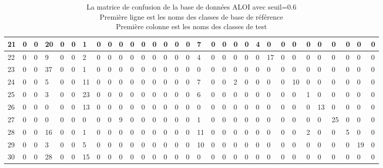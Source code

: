 \documentclass[french,12pt,a4paper,oneside,notitlepage]{report}
\begin{document}
\begin{table}[!ht]
\begin{center}
{\begin{tabular}{|l|l|l|l|l|l|l|l|l|l|l|l|l|l|l|l|l|l|l|l|l|l|l|l|l|l|l|l|l|l|l|}
\hline
21&0&0&20&0&0&1&0&0&0&0&0&0&0&0&0&7&0&0&0&0&4&0&0&0&0&0&0&0&0&0\\
\hline
22&0&0&9&0&0&2&0&0&0&0&0&0&0&0&0&4&0&0&0&0&0&17&0&0&0&0&0&0&0&0\\
\hline
23&0&0&37&0&0&1&0&0&0&0&0&0&0&0&0&0&0&0&0&0&0&0&0&0&0&0&0&0&0&0\\
\hline
24&0&0&5&0&0&11&0&0&0&0&0&0&0&0&0&7&0&0&2&0&0&0&0&10&0&0&0&0&0&0\\
\hline
25&0&0&3&0&0&23&0&0&0&0&0&0&0&0&0&6&0&0&0&0&0&0&0&0&1&0&0&0&0&0\\
\hline
26&0&0&0&0&0&13&0&0&0&0&0&0&0&0&0&0&0&0&0&0&0&0&0&0&0&13&0&0&0&0\\
\hline
27&0&0&0&0&0&0&0&0&9&0&0&0&0&0&0&1&0&0&0&0&0&0&0&0&0&0&25&0&0&0\\
\hline
28&0&0&16&0&0&1&0&0&0&0&0&0&0&0&0&11&0&0&0&0&0&0&0&0&2&0&0&5&0&0\\
\hline
29&0&0&3&0&0&5&0&0&0&0&0&0&0&0&0&10&0&0&0&0&0&0&0&0&0&0&0&0&19&0\\
\hline
30&0&0&28&0&0&15&0&0&0&0&0&0&0&0&0&0&0&0&0&0&0&0&0&0&0&0&0&0&0&0\\
\hline
	    \end{tabular}
	}
	\end{center}
	\caption {La matrice de confusion de la base de données ALOI avec seuil=0.6\\
	\hspace*{1.7cm}  Première ligne est les noms des classes de base de référence\\
	\hspace*{1.7cm}  Première colonne est les noms des classes de test}
\end{table}
\end{document}
